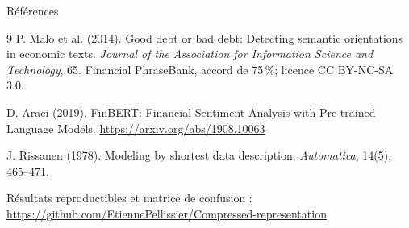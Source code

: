 \documentclass[aspectratio=169,10pt]{beamer}
\begin{document}
\begin{frame}{Références}
  \footnotesize
  \begin{thebibliography}{9}
    P. Malo et al. (2014).
    \newblock Good debt or bad debt: Detecting semantic orientations in
    economic texts.
    \newblock \emph{Journal of the Association for Information Science and
    Technology}, 65.
    \newblock Financial PhraseBank, accord de 75\,\%; licence CC BY-NC-SA 3.0.

    D. Araci (2019).
    \newblock FinBERT: Financial Sentiment Analysis with Pre-trained Language
    Models.
    \newblock \url{https://arxiv.org/abs/1908.10063}

    J. Rissanen (1978).
    \newblock Modeling by shortest data description.
    \newblock \emph{Automatica}, 14(5), 465--471.
  \end{thebibliography}
  \vfill
  \scriptsize
  Résultats reproductibles et matrice de confusion :
  \url{https://github.com/EtiennePellissier/Compressed-representation}
\end{frame}
\end{document}
